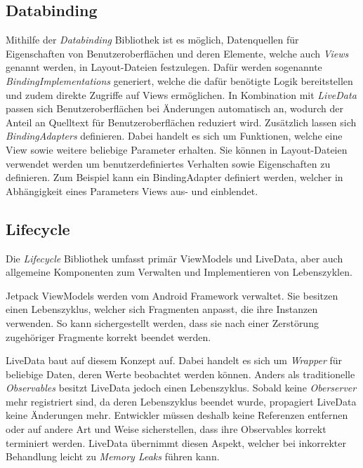 \subsection{Databinding}
\label{subsec:app:jetpack:databinding}
Mithilfe der \textit{Databinding} Bibliothek ist es möglich, Datenquellen für Eigenschaften von Benutzeroberflächen und deren Elemente, welche auch \textit{Views} genannt werden, in Layout-Dateien festzulegen.
Dafür werden sogenannte \textit{BindingImplementations} generiert, welche die dafür benötigte Logik bereitstellen und zudem direkte Zugriffe auf Views ermöglichen.
In Kombination mit \textit{LiveData} passen sich Benutzeroberflächen bei Änderungen automatisch an, wodurch der Anteil an Quelltext für Benutzeroberflächen reduziert wird.
Zusätzlich lassen sich \textit{BindingAdapters} definieren.
Dabei handelt es sich um Funktionen, welche eine View sowie weitere beliebige Parameter erhalten.
Sie können in Layout-Dateien verwendet werden um benutzerdefiniertes Verhalten sowie Eigenschaften zu definieren.
Zum Beispiel kann ein BindingAdapter definiert werden, welcher in Abhängigkeit eines Parameters Views aus- und einblendet.

\subsection{Lifecycle}
\label{subsec:app:jetpack:lifecycle}
Die \textit{Lifecycle} Bibliothek umfasst primär ViewModels und LiveData, aber auch allgemeine Komponenten zum Verwalten und Implementieren von Lebenszyklen.

Jetpack ViewModels werden vom Android Framework verwaltet.
Sie besitzen einen Lebenszyklus, welcher sich Fragmenten anpasst, die ihre Instanzen verwenden.
So kann sichergestellt werden, dass sie nach einer Zerstörung zugehöriger Fragmente korrekt beendet werden.

LiveData baut auf diesem Konzept auf.
Dabei handelt es sich um \textit{Wrapper} für beliebige Daten, deren Werte beobachtet werden können.
Anders als traditionelle \textit{Observables} besitzt LiveData jedoch einen Lebenszyklus.
Sobald keine \textit{Oberserver} mehr registriert sind, da deren Lebenszyklus beendet wurde, propagiert LiveData keine Änderungen mehr.
Entwickler müssen deshalb keine Referenzen entfernen oder auf andere Art und Weise sicherstellen, dass ihre Observables korrekt terminiert werden.
LiveData übernimmt diesen Aspekt, welcher bei inkorrekter Behandlung leicht zu \textit{Memory Leaks} führen kann.

